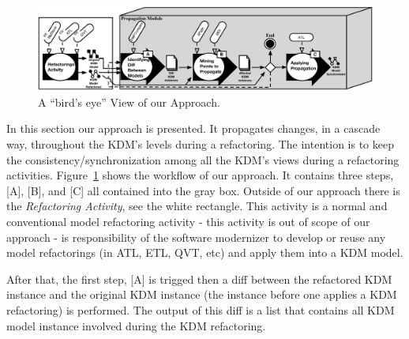 %


\begin{figure}[t]
	\centering
	\includegraphics[scale=0.545]{figuras/ApproachLifeCicle2}
	\caption{A ``bird's eye'' View of our Approach.}
	\label{fig:approach}
\end{figure}

In this section our approach is presented. It propagates changes, in a cascade way, throughout the KDM's levels during a refactoring. The intention is to keep the consistency/synchronization among all the KDM's views during a refactoring activities.
%
%
%
Figure~\ref{fig:approach} shows the workflow of our approach. It contains three steps, [A], [B], and [C] all contained into the gray box. Outside of our approach there is the \textit{Refactoring Activity}, see the white rectangle. This activity is a normal and conventional model refactoring activity - this activity is out of scope of our approach - is responsibility of the software modernizer to develop or reuse any model refactorings (in ATL, ETL, QVT, etc) and apply them into a KDM model. %

After that, the first step, [A] is trigged then a diff between the refactored KDM instance and the original KDM instance (the instance before one applies a KDM refactoring) is performed. The output of this diff is a list that contains all KDM model instance involved during the KDM refactoring. %


